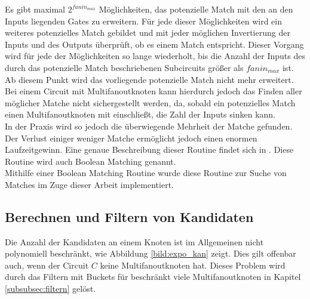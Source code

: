 \documentclass[11pt, a4paper, german]{article}
\begin{document}
Es gibt maximal $2^{fanin_{max}}$ Möglichkeiten, das potenzielle Match mit den an den Inputs liegenden Gates zu erweitern. Für jede dieser Möglichkeiten wird ein weiteres potenzielles Match gebildet und mit jeder möglichen Invertierung der Inputs und des Outputs überprüft, ob es einem Match entspricht.
Dieser Vorgang wird für jede der Möglichkeiten so lange wiederholt, bis die Anzahl der Inputs des durch das potenzielle Match beschriebenen Subcircuits größer als $fanin_{max}$ ist. Ab diesem Punkt wird das vorliegende potenzielle Match nicht mehr erweitert. \\
Bei einem Circuit mit Multifanoutknoten kann hierdurch jedoch das Finden aller möglicher Matche nicht sichergestellt werden, da, sobald ein potenzielles Match einen Multifanoutknoten mit einschließt, die Zahl der Inputs sinken kann. \\
In der Praxis wird so jedoch die überwiegende Mehrheit der Matche gefunden. Der Verlust einiger weniger Matche ermöglicht jedoch einen enormen Laufzeitgewinn.
Eine genaue Beschreibung dieser Routine findet sich in \cite{BooleanMatching}. Diese Routine wird auch Boolean Matching genannt.\\
Mithilfe einer Boolean Matching Routine wurde diese Routine zur Suche von Matches im Zuge dieser Arbeit implementiert. 

\subsection{Berechnen und Filtern von Kandidaten}
\label{subsec:kand_prob}
Die Anzahl der Kandidaten an einem Knoten ist im Allgemeinen nicht polynomiell beschränkt, wie Abbildung \ref{bild:expo_kan} zeigt. Dies gilt offenbar auch, wenn der Circuit $C$ keine Multifanoutknoten hat. Dieses Problem wird durch das Filtern mit Buckets für beschränkt viele Multifanoutknoten in Kapitel \ref{subsubsec:filtern} gelöst.
\end{document}
